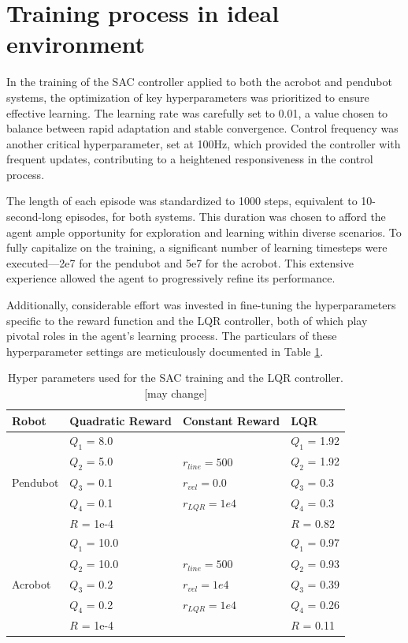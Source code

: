 \section{Training process in ideal environment}
In the training of the SAC controller applied to both the acrobot and pendubot systems, the optimization of key hyperparameters was prioritized to ensure effective learning. The learning rate was carefully set to 0.01, a value chosen to balance between rapid adaptation and stable convergence. Control frequency was another critical hyperparameter, set at 100Hz, which provided the controller with frequent updates, contributing to a heightened responsiveness in the control process.

The length of each episode was standardized to 1000 steps, equivalent to 10-second-long episodes, for both systems. This duration was chosen to afford the agent ample opportunity for exploration and learning within diverse scenarios. To fully capitalize on the training, a significant number of learning timesteps were executed—2e7 for the pendubot and 5e7 for the acrobot. This extensive experience allowed the agent to progressively refine its performance.

Additionally, considerable effort was invested in fine-tuning the hyperparameters specific to the reward function and the LQR controller, both of which play pivotal roles in the agent's learning process. The particulars of these hyperparameter settings are meticulously documented in Table \ref{tab:training_parameters}.

\begin{table}[H]
  \centering
  \begin{tabular}{p{2cm} | p{3cm} | p{3cm} | p{3cm}}
  Robot & Quadratic Reward  & Constant Reward & LQR\\
  \hline
  \multirow{5}{*}{Pendubot} & \(Q_1\) = 8.0  &  & \(Q_1\) = 1.92\\
  & \(Q_2\) = 5.0  & \(r_{line}=500\) & \(Q_2\) = 1.92\\
  & \(Q_3\) = 0.1  & \(r_{vel}=0.0\) & \(Q_3\) = 0.3\\
  & \(Q_4\) = 0.1  & \(r_{LQR}=1e4\)& \(Q_4\) = 0.3\\
  & \(R\) = 1e-4  & & \(R\) = 0.82\\
  \hline
  \multirow{5}{*}{Acrobot} & \(Q_1\) = 10.0  &  & \(Q_1\) = 0.97\\
  & \(Q_2\) = 10.0  & \(r_{line}=500\) & \(Q_2\) = 0.93\\
  & \(Q_3\) = 0.2  & \(r_{vel}=1e4\) & \(Q_3\) = 0.39\\
  & \(Q_4\) = 0.2  & \(r_{LQR}=1e4\) & \(Q_4\) = 0.26\\
  & \(R\) = 1e-4  &  & \(R\) = 0.11\\
  \end{tabular}
 \caption{Hyper parameters used for the SAC training and the LQR controller.[may change]}
 \label{tab:training_parameters}
\end{table}

